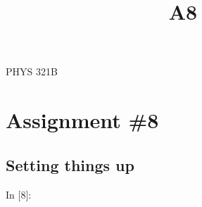 \documentclass[11pt]{article}
\title{A8}
\newif\ifleftmargins
\newlength{\promptlength}
\begin{document}
    
    
    
    
    

    
    PHYS 321B

\hypertarget{assignment-8}{%
\section{Assignment \#8}\label{assignment-8}}

    \hypertarget{setting-things-up}{%
\subsection{Setting things up}\label{setting-things-up}}

    \needspace{1.1cm}
\settowidth{\promptlength}{ In [8] }
\ifleftmargins\hspace{-\promptlength}\hspace{-5pt}\fi
{\color{incolor}In [{\color{incolor}8}]:}
\ifleftmargins\vspace{-2.7ex}\fi
\end{document}
